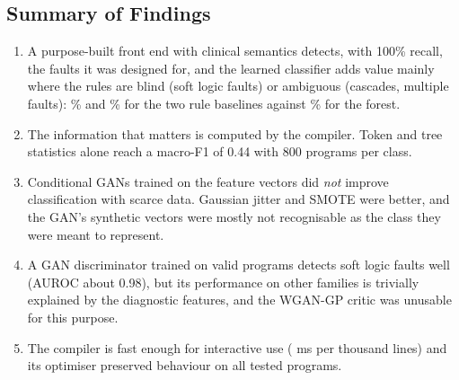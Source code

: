 \subsection{Summary of Findings}

\begin{enumerate}
    \item A purpose-built front end with clinical semantics detects, with 100\% recall, the faults it was designed for, and the learned classifier
    adds value mainly where the rules are blind (soft logic faults) or ambiguous (cascades, multiple faults): \RuleFirstAcc\% and \RulePrioAcc\% for the two rule baselines against
    \RFAcc\% for the forest.
    \item The information that matters is computed by the compiler. Token and tree statistics alone reach a macro-F1 of 0.44 with 800 programs per class.
    \item Conditional GANs trained on the feature vectors did \emph{not} improve classification with scarce data. Gaussian jitter and SMOTE were better, and
    the GAN's synthetic vectors were mostly not recognisable as the class they were meant to represent.
    \item A GAN discriminator trained on valid programs detects soft logic faults well (AUROC about 0.98), but its performance on other families is
    trivially explained by the diagnostic features, and the WGAN-GP critic was unusable for this purpose.
    \item The compiler is fast enough for interactive use (\MsPerKloc{} ms per thousand lines) and its optimiser preserved behaviour on all tested programs.
\end{enumerate}

\newpage
